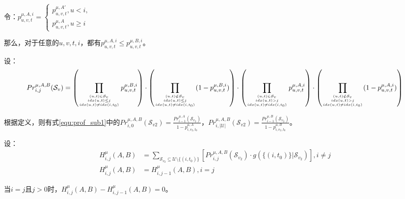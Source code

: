 令：$p_{u,v,t}^{\mu,A,i}=\begin{cases}p_{u,v,t}^{\mu,A'}, u<i,\\p_{u,v,t}^{\mu,A},u\ge i \end{cases}$

那么，对于任意的$u,v,t,i$，都有$p_{u,v,t}^{\mu,A,i} \le p_{u,v,t}^{\mu,B,i}$。

设：
\begin{equation}
\footnotesize
    Pr_{i,j}^{\mu,A,B}(\mathcal{S}_v)=\left(\prod_{{(u,t)\in \mathcal{S}_v \atop idx(u,t)\le j } \atop{ idx(u,t) \ne idx(i,t_0)}}p_{u,v,t}^{\mu,B,i}\right)\cdot \left(\prod_{{(u,t) \notin \mathcal{S}_v \atop idx(u,t)\le j} \atop{ idx(u,t) \ne idx(i,t_0)}} (1-p_{u,v,t}^{\mu,B,i})\right)
    \cdot \left(\prod_{{(u,t)\in \mathcal{S}_v \atop idx(u,t)> j} \atop {idx(u,t)\ne idx(i,t_0)}}p_{u,v,t}^{\mu,A,i}\right)\cdot \left(\prod_{{(u,t) \notin \mathcal{S}_v \atop idx(u,t)> j} \atop{ idx(u,t)\ne idx(i,t_0)}} (1-p_{u,v,t}^{\mu,A,i})\right)
\end{equation}

根据定义，则有式\ref{equ:prof_sub1}中的$Pr_{i,0}^{\mu,A,B}(\mathcal{S}_{v2})=\frac{Pr_{i-1}^{\mu,A}(\mathcal{S}_{v_2})}{1-p_{i,v_2,t_0}^{\mu,A}}$，$Pr_{i,|\mathcal{U}|}^{\mu,A,B}(\mathcal{S}_{v2})=\frac{Pr_{i-1}^{\mu,B}(\mathcal{S}_{v_2})}{1-p_{i,v_2,t_0}^{\mu,B}}$。

设：
\begin{align}
    H_{i,j}^{\mu}(A,B)&= \sum_{\mathcal{S}_{v_2}\subseteq \mathcal{U} \setminus \{(i,t_0)\}}\left[Pr_{i,j}^{\mu,A,B}(\mathcal{S}_{v_2}) \cdot g(\{(i,t_0)\} |\mathcal{S}_{v_2})\right],i\ne j 
    \\H_{i,j}^{\mu}(A,B)&=H_{i,j-1}^{\mu}(A,B),i=j
\end{align}

当$i=j$且$j>0$时，$H_{i,j}^{\mu}(A,B)-H_{i,j-1}^{\mu}(A,B)=0$。

